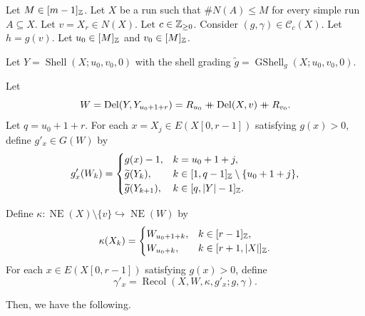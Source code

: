 \begin{lemma}[Deletion]\label{lem:vertical-delete}
Let $M\in[m-1]_{\mathbb Z}$.
Let $X$ be a run such that $\#N(A)\le M$ for every simple run $A\subseteq X$.
Let $v=X_r\in N(X)$. Let $c\in\mathbb Z_{\ge0}$.
Consider $(g,\gamma)\in\mathcal C_c(X)$.
Let $h=g(v)$. Let $u_0\in[M]_{\mathbb Z}$ and $v_0\in[M]_{\mathbb Z}$.
\begin{hypotheses}
\item\label{hyp:deletion-shell} Let $Y=\operatorname{Shell}(X;u_0,v_0,0)$ with the shell grading $\widetilde g=\operatorname{GShell}_{g}(X;u_0,v_0,0)$.
\item\label{hyp:deletion-edge} Let
\[
 W=\operatorname{Del}(Y,Y_{u_0+1+r})
 =R_{u_0}\mathbin{+\mkern-10mu+}\operatorname{Del}(X,v)\mathbin{+\mkern-10mu+} R_{v_0}.
\]
Let $q=u_0+1+r$. For each $x=X_j\in E(X[0,r-1])$ satisfying $g(x)>0$, define $g'_x\in G(W)$ by
\[
 g'_x(W_k)=\begin{cases}
 g(x)-1,&k=u_0+1+j,\\
 \widetilde g(Y_k),&k\in[1,q-1]_{\mathbb Z}\setminus\{u_0+1+j\},\\
 \widetilde g(Y_{k+1}),&k\in[q,|Y|-1]_{\mathbb Z}.
 \end{cases}
\]
\item\label{hyp:deletion-color} Define
$\kappa\colon\operatorname{NE}(X)\setminus\{v\}\hookrightarrow\operatorname{NE}(W)$ by
\[
 \kappa(X_k)=
 \begin{cases}
 W_{u_0+1+k},&k\in[r-1]_{\mathbb Z},\\
 W_{u_0+k},&k\in[r+1,|X|]_{\mathbb Z}.
 \end{cases}
\]
For each $x\in E(X[0,r-1])$ satisfying $g(x)>0$, define
\[
 \gamma'_x=\operatorname{Recol}(X,W,\kappa,g'_x;g,\gamma).
\]
\end{hypotheses}
Then, we have the following.


\end{lemma}
